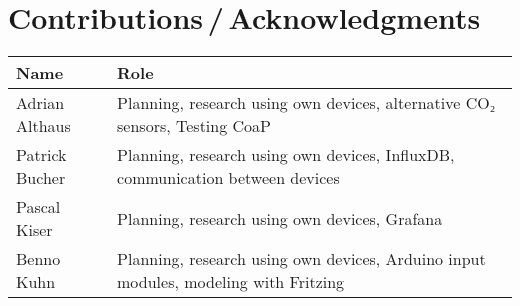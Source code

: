 \section{Contributions\,/\,Acknowledgments}

\begin{tabular}{p{4cm}p{9cm}}
\textbf{Name} & \textbf{Role} \\
\hline
Adrian Althaus & Planning, research using own devices, alternative CO₂ sensors, Testing CoaP \\
Patrick Bucher & Planning, research using own devices, InfluxDB, communication between devices \\
Pascal Kiser & Planning, research using own devices, Grafana \\
Benno Kuhn & Planning, research using own devices, Arduino input modules, modeling with Fritzing
\end{tabular}
